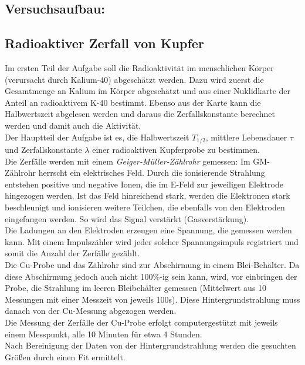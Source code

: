 \documentclass[12pt,a4paper]{article}
\begin{document}
\begin{multicols}{2}

\section{Versuchsaufbau:}



\subsection{Radioaktiver Zerfall von Kupfer}

Im ersten Teil der Aufgabe soll die Radioaktivität im menschlichen Körper (verursacht durch Kalium-40) abgeschätzt werden. Dazu wird zuerst die Gesamtmenge an Kalium im Körper abgeschätzt und aus einer Nuklidkarte der Anteil an radioaktivem K-40 bestimmt. Ebenso aus der Karte kann die Halbwertszeit abgelesen werden und daraus die Zerfallskonstante berechnet werden und damit auch die Aktivität.\\

\noindent Der Hauptteil der Aufgabe ist es, die Halbwertszeit $T_{1/2}$, mittlere Lebensdauer $\tau$ und Zerfallskonstante $\lambda$ einer radioaktiven Kupferprobe zu bestimmen.\\
Die Zerfälle werden mit einem \emph{Geiger-Müller-Zählrohr} gemessen: Im GM-Zählrohr herrscht ein elektrisches Feld. Durch die ionisierende Strahlung entstehen positive und negative Ionen, die im E-Feld zur jeweiligen Elektrode hingezogen werden. Ist das Feld hinreichend stark, werden die Elektronen stark beschleunigt und ionisieren weitere Teilchen, die ebenfalls von den Elektroden eingefangen werden. So wird das Signal verstärkt (Gasverstärkung).\\
Die Ladungen an den Elektroden erzeugen eine Spannung, die gemessen werden kann. Mit einem Impulszähler wird jeder solcher Spannungsimpuls registriert und somit die Anzahl der Zerfälle gezählt.\\

\noindent Die Cu-Probe und das Zählrohr sind zur Abschirmung in einem Blei-Behälter. Da diese Abschirmung jedoch auch nicht 100\%-ig sein kann, wird, vor einbringen der Probe, die Strahlung im leeren Bleibehälter gemessen (Mittelwert aus 10 Messungen mit einer Messzeit von jeweils 100s). Diese Hintergrundstrahlung muss danach von der Cu-Messung abgezogen werden.\\
Die Messung der Zerfälle der Cu-Probe erfolgt computergestützt mit jeweils einem Messpunkt, alle 10 Minuten für etwa 4 Stunden.\\
Nach Bereinigung der Daten von der Hintergrundstrahlung werden die gesuchten Größen durch einen Fit ermittelt.


\end{multicols}
\end{document}
